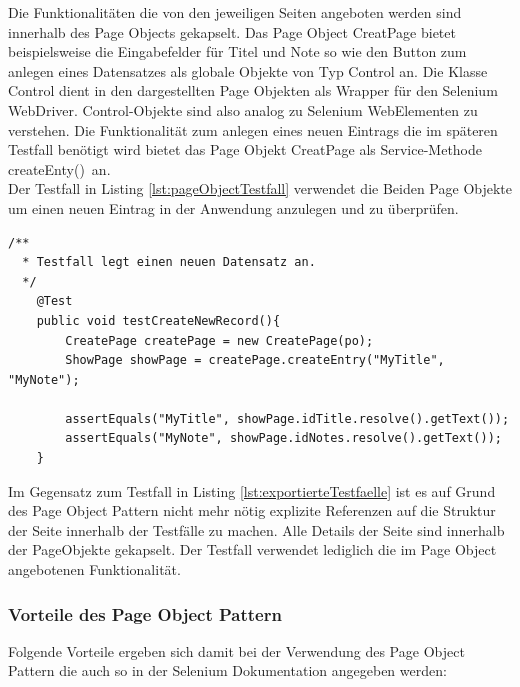 Die Funktionalitäten die von den jeweiligen Seiten angeboten werden sind innerhalb des Page Objects gekapselt. Das Page Object CreatPage bietet beispielsweise die Eingabefelder für Titel und Note so wie den Button zum anlegen eines Datensatzes als globale Objekte von Typ Control an.
Die Klasse Control dient in den dargestellten Page Objekten als Wrapper für den Selenium WebDriver. Control-Objekte sind also analog zu Selenium WebElementen zu verstehen.
Die Funktionalität zum anlegen eines neuen Eintrags die im späteren Testfall benötigt wird bietet das Page Objekt CreatPage als Service-Methode \grq createEnty()\grq\ an.\\

Der Testfall in Listing \ref{lst:pageObjectTestfall} verwendet die Beiden Page Objekte um einen neuen Eintrag in der Anwendung anzulegen und zu überprüfen.


\begin{lstlisting}[caption={Page Object Testfall},label={lst:pageObjectTestfall}]  
  /**
  * Testfall legt einen neuen Datensatz an.
  */
 	@Test
	public void testCreateNewRecord(){
		CreatePage createPage = new CreatePage(po);
		ShowPage showPage = createPage.createEntry("MyTitle", "MyNote");

		assertEquals("MyTitle", showPage.idTitle.resolve().getText());
		assertEquals("MyNote", showPage.idNotes.resolve().getText());
	}

\end{lstlisting}

Im Gegensatz zum Testfall in Listing \ref{lst:exportierteTestfaelle} ist es auf Grund des Page Object Pattern nicht mehr nötig explizite Referenzen auf die Struktur der Seite innerhalb der Testfälle zu machen. Alle Details der Seite sind innerhalb der PageObjekte gekapselt. Der Testfall verwendet lediglich die im Page Object angebotenen Funktionalität.


\subsubsection{Vorteile des Page Object Pattern}
\label{sec:vorteile_des_page_object_pattern}

Folgende Vorteile ergeben sich damit bei der Verwendung des Page Object Pattern die auch so in der Selenium Dokumentation \cite{selenium_selenium_2015-2} angegeben werden:

